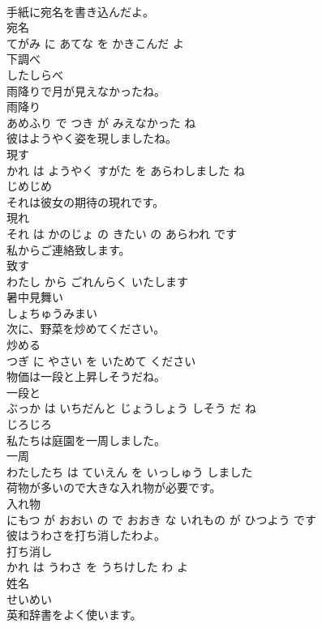 \documentclass[8pt]{extreport}
\begin{document}
\begin{CJK}{UTF8}{min}
\\	手紙に宛名を書き込んだよ。	
\\	宛名 
\\	てがみ に あてな を かきこんだ よ			
\\	下調べ	
\\	したしらべ		
\\	雨降りで月が見えなかったね。	
\\	雨降り 
\\	あめふり で つき が みえなかった ね			
\\	彼はようやく姿を現しましたね。	
\\	現す 
\\	かれ は ようやく すがた を あらわしました ね			
\\	じめじめ	
\\	それは彼女の期待の現れです。	
\\	現れ 
\\	それ は かのじょ の きたい の あらわれ です			
\\	私からご連絡致します。	
\\	致す 
\\	わたし から ごれんらく いたします			
\\	暑中見舞い	
\\	しょちゅうみまい		
\\	次に、野菜を炒めてください。	
\\	炒める 
\\	つぎ に やさい を いためて ください			
\\	物価は一段と上昇しそうだね。	
\\	一段と 
\\	ぶっか は いちだんと じょうしょう しそう だ ね			
\\	じろじろ	
\\	私たちは庭園を一周しました。	
\\	一周 
\\	わたしたち は ていえん を いっしゅう しました			
\\	荷物が多いので大きな入れ物が必要です。	
\\	入れ物 
\\	にもつ が おおい の で おおき な いれもの が ひつよう です			
\\	彼はうわさを打ち消したわよ。	
\\	打ち消し 
\\	かれ は うわさ を うちけした わ よ			
\\	姓名	
\\	せいめい		
\\	英和辞書をよく使います。	

\end{CJK}
\end{document}
